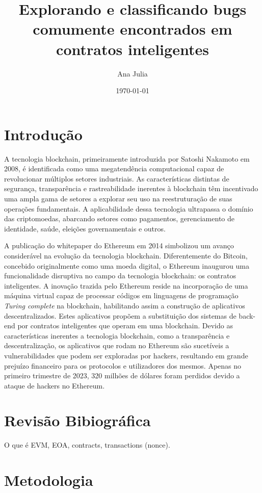 \documentclass[11pt]{article}
\author{Ana Julia}
\date{\today}
\title{Explorando e classificando bugs comumente encontrados em contratos inteligentes}
\begin{document}
\maketitle
\tableofcontents



\section{Introdução}
\label{sec:org57b5374}
A tecnologia blockchain, primeiramente introduzida por Satoshi Nakamoto em 2008, é identificada como uma megatendência computacional capaz de revolucionar múltiplos setores industriais\cite{1}. As características distintas de segurança, transparência e rastreabilidade inerentes à blockchain têm incentivado uma ampla gama de setores a explorar seu uso na reestruturação de suas operações fundamentais. A aplicabilidade dessa tecnologia ultrapassa o domínio das criptomoedas, abarcando setores como pagamentos, gerenciamento de identidade, saúde, eleições governamentais e outros\cite{2}.

A publicação do whitepaper do Ethereum em 2014 simbolizou um avanço considerável na evolução da tecnologia blockchain\cite{3}. Diferentemente do Bitcoin, concebido originalmente como uma moeda digital, o Ethereum inaugurou uma funcionalidade disruptiva no campo da tecnologia blockchain: os contratos inteligentes. A inovação trazida pelo Ethereum reside na incorporação de uma máquina virtual capaz de processar códigos em linguagens de programação \textit{Turing complete} na blockchain, habilitando assim a construção de aplicativos descentralizados. Estes aplicativos propõem a substituição dos sistemas de back-end por contratos inteligentes que operam em uma blockchain\cite{7}. Devido as características inerentes a tecnologia blockchain, como a transparência e descentralização, os aplicativos que rodam no Ethereum são sucetíveis a vulnerabilidades que podem ser exploradas por hackers, resultando em grande prejuízo financeiro para os protocolos e utilizadores dos mesmos. Apenas no primeiro trimestre de 2023, 320 milhões de dólares foram perdidos devido a ataque de hackers no Ethereum\autocite{1}.


\cite{1}
\section{Revisão Bibiográfica}
\label{sec:orga8686da}

O que é EVM, EOA, contracts, transactions (nonce).
\section{Metodologia}
\label{sec:org9a02fd6}
\end{document}
